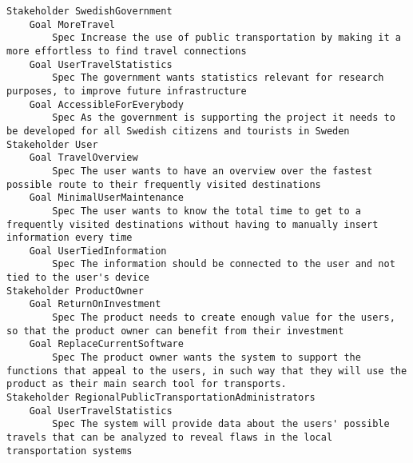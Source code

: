 

\begin{lstlisting}
Stakeholder SwedishGovernment
	Goal MoreTravel
		Spec Increase the use of public transportation by making it a more effortless to find travel connections
	Goal UserTravelStatistics
		Spec The government wants statistics relevant for research purposes, to improve future infrastructure
	Goal AccessibleForEverybody
		Spec As the government is supporting the project it needs to be developed for all Swedish citizens and tourists in Sweden
Stakeholder User
	Goal TravelOverview
		Spec The user wants to have an overview over the fastest possible route to their frequently visited destinations
	Goal MinimalUserMaintenance
		Spec The user wants to know the total time to get to a frequently visited destinations without having to manually insert information every time
	Goal UserTiedInformation
		Spec The information should be connected to the user and not tied to the user's device
Stakeholder ProductOwner
	Goal ReturnOnInvestment
		Spec The product needs to create enough value for the users, so that the product owner can benefit from their investment
	Goal ReplaceCurrentSoftware
		Spec The product owner wants the system to support the functions that appeal to the users, in such way that they will use the product as their main search tool for transports.
Stakeholder RegionalPublicTransportationAdministrators
	Goal UserTravelStatistics
		Spec The system will provide data about the users' possible travels that can be analyzed to reveal flaws in the local transportation systems

\end{lstlisting}